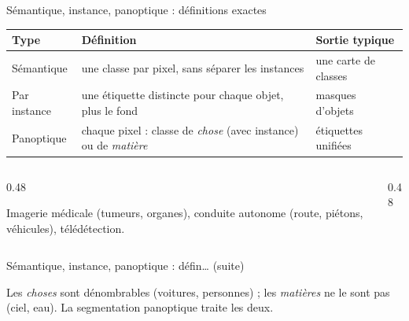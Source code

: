 \begin{frame}{Sémantique, instance, panoptique : définitions exactes}
\begin{center}
\begin{tabular}{@{}p{3.0cm}p{5.0cm}p{5.4cm}@{}}
\toprule
\textbf{Type} & \textbf{Définition} & \textbf{Sortie typique} \\
\midrule
Sémantique & une classe par pixel, sans séparer les instances & une carte de classes \\
Par instance & une étiquette distincte pour chaque objet, plus le fond & masques d'objets \\
Panoptique & chaque pixel : classe de \emph{chose} (avec instance) ou de \emph{matière} & étiquettes unifiées \\
\bottomrule
\end{tabular}
\end{center}
\vspace{1mm}
\begin{columns}[t]
\begin{column}{0.48\textwidth}
\begin{ebox}[Applications]
Imagerie médicale (tumeurs, organes), conduite autonome (route, piétons,
véhicules), télédétection.
\end{ebox}
\end{column}
\begin{column}{0.48\textwidth}

\end{column}
\end{columns}
\end{frame}
\begin{frame}{Sémantique, instance, panoptique : défin… (suite)}
\begin{wbox}
Les \emph{choses} sont dénombrables (voitures, personnes) ; les \emph{matières}
ne le sont pas (ciel, eau). La segmentation panoptique traite les deux.
\end{wbox}
\end{frame}

